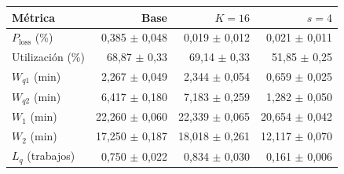 \begin{tabular}{lrrr}
\toprule
Métrica & Base & $K=16$ & $s=4$ \\
\midrule
$P_{\text{loss}}$ (\%) & 0,385 $\pm$ 0,048 & 0,019 $\pm$ 0,012 & 0,021 $\pm$ 0,011 \\
Utilización (\%) & 68,87 $\pm$ 0,33 & 69,14 $\pm$ 0,33 & 51,85 $\pm$ 0,25 \\
$W_{q1}$ (min) & 2,267 $\pm$ 0,049 & 2,344 $\pm$ 0,054 & 0,659 $\pm$ 0,025 \\
$W_{q2}$ (min) & 6,417 $\pm$ 0,180 & 7,183 $\pm$ 0,259 & 1,282 $\pm$ 0,050 \\
$W_1$ (min) & 22,260 $\pm$ 0,060 & 22,339 $\pm$ 0,065 & 20,654 $\pm$ 0,042 \\
$W_2$ (min) & 17,250 $\pm$ 0,187 & 18,018 $\pm$ 0,261 & 12,117 $\pm$ 0,070 \\
$L_q$ (trabajos) & 0,750 $\pm$ 0,022 & 0,834 $\pm$ 0,030 & 0,161 $\pm$ 0,006 \\
\bottomrule
\end{tabular}
